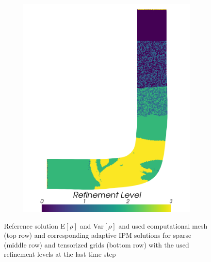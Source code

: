 \begin{figure}[H]
\begin{subfigure}{0.31\linewidth}
		\includegraphics[width=\linewidth]{figs/pipe/euler2D_pipe_n1-4_tg1-3_refinementLevel.png}
		\caption{}
		\label{fig:adIPMSolutionsPipeTGRI}
	\end{subfigure}
	\caption{Reference solution E$[\rho]$ and Var$[\rho]$ and used computational mesh (top row) and corresponding adaptive IPM solutions for sparse (middle row) and tensorized grids (bottom row) with the used refinement levels at the last time step}
	\label{fig:solution3D}
\end{figure}